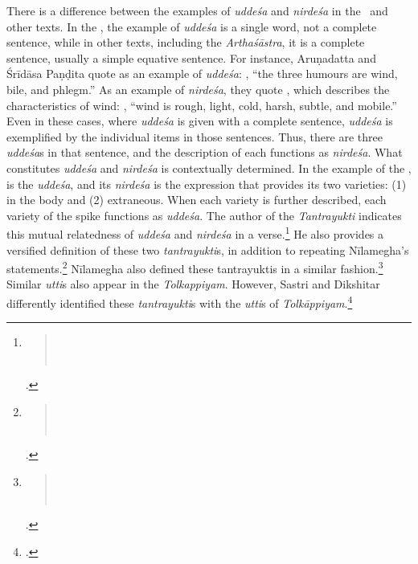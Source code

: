 There is a difference between the examples of 
\emph{uddeśa} and \emph{nirdeśa} in the \SS\ and other texts. 
In the \SS, the example of \emph{uddeśa} is a single word, 
not a complete sentence, while in other texts, including the \emph{Arthaśāstra}, 
it is a complete sentence, usually a simple equative sentence. 
For instance, Aruṇadatta and Śrīdāsa Paṇḍita quote  as an example of \emph{uddeśa}: 
, 
“the three humours are wind, bile, and phlegm.” 
As an example of \emph{nirdeśa}, they quote , 
which describes the characteristics of wind: 
,
“wind is rough, light, cold, harsh, subtle, and mobile.”
Even in these cases, where \emph{uddeśa} is given with a complete sentence, 
\emph{uddeśa} is exemplified by the individual items in those sentences. 
Thus, there are three \emph{uddeśa}s in that sentence, 
and the description of each functions as \emph{nirdeśa}. 
What constitutes \emph{uddeśa} and \emph{nirdeśa} is contextually determined. 
In the example of the \SS,  is the \emph{uddeśa}, 
and its \emph{nirdeśa} is the expression that provides its two varieties: 
(1) in the body and (2) extraneous. 
When each variety is further described, each variety of the spike functions as \emph{uddeśa}. 
The author of the \emph{Tantrayukti} indicates 
this mutual relatedness of \emph{uddeśa} and \emph{nirdeśa} in a verse.\footnote{
	\begin{verse}
		\\
		\\
	\end{verse}
	\cite[12]{nara-1949}.} 
He also provides a versified definition of these two \emph{tantrayukti}s, 
in addition to repeating Nīlamegha's statements.\footnote{
	\begin{verse}
		\\
		\\
	\end{verse}
	\cite[12]{nara-1949}.} 
Nīlamegha also defined these tantrayuktis in a similar fashion.\footnote{
	\begin{verse}
		\\
		\\
	\end{verse}
	\cite[6]{muth-1976}.}  
Similar \emph{utti}s also appear in the \emph{Tolkappiyam}. 
However, Sastri and Dikshitar differently identified these \emph{tantrayukti}s 
with the \emph{utti}s of \emph{Tolkāppiyam}.\footcite[85]{chev-2009}


